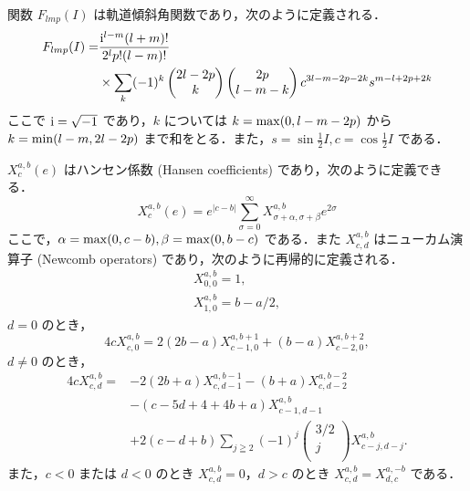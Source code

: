 \documentclass[11pt,a4paper,oneside,onecolumn]{jarticle}
\begin{document}
関数 $F_{lmp} (I)$ は軌道傾斜角関数であり，次のように定義される．
\begin{equation}
\begin{split}
F_{lmp} (I) = & \frac{{\rm i}^{l - m} (l + m) !}{2^l p ! (l - m) !} \\
& \times \sum_k (-1)^k 
\begin{pmatrix}
2l - 2p \\
k \\
\end{pmatrix}
\begin{pmatrix}
2p \\
l - m - k \\
\end{pmatrix}
c^{3l - m - 2p - 2k} s^{m - l + 2p + 2k}
\end{split}
\end{equation}
ここで ${\rm i} = \sqrt{-1}$ であり，$k$ については $k = {\rm max} (0, l - m - 2p)$ から $k = {\rm min} (l - m, 2l - 2p)$ まで和をとる．また，$s = \sin \frac{1}{2} I, c = \cos \frac{1}{2} I$ である．

$X_c^{a, b} (e)$ はハンセン係数 (Hansen coefficients) であり，次のように定義できる．
\begin{equation}
X_c^{a, b} (e) = e^{|c - b|} \sum_{\sigma = 0}^{\infty} X_{\sigma + \alpha, \sigma + \beta}^{a, b} e^{2 \sigma}
\end{equation}
ここで，$\alpha = {\rm max} (0, c - b), \beta = {\rm max} (0, b - c)$ である．また $X_{c, d}^{a, b}$ はニューカム演算子 (Newcomb operators) であり，次のように再帰的に定義される．
\begin{eqnarray}
X_{0, 0}^{a, b} = 1,\\
X_{1, 0}^{a, b} = b - a / 2,
\end{eqnarray}
$d = 0$ のとき，
\begin{equation}
4 c X_{c, 0}^{a, b} = 2 (2b - a) X_{c - 1, 0}^{a, b + 1} + (b - a) X_{c - 2, 0}^{a, b + 2},
\end{equation}
$d \not = 0$ のとき，
\begin{equation}
\begin{split}
4 c X_{c, d}^{a, b} = & -2 (2b + a) X_{c, d - 1}^{a, b - 1} - (b + a) X_{c, d - 2}^{a, b - 2} \\
& - (c - 5d + 4 + 4b +a) X_{c - 1, d - 1}^{a, b} \\
& + 2 (c - d + b) \sum_{j \geqq 2} (-1)^j
\begin{pmatrix}
3/2 \\
j \\
\end{pmatrix}
X_{c - j, d - j}^{a, b}.
\end{split}
\end{equation}
また，$c < 0$ または $d < 0$ のとき $X_{c, d}^{a, b} = 0$，$d > c$ のとき $X_{c, d}^{a, b} = X_{d, c}^{a, -b}$ である．
\end{document}
